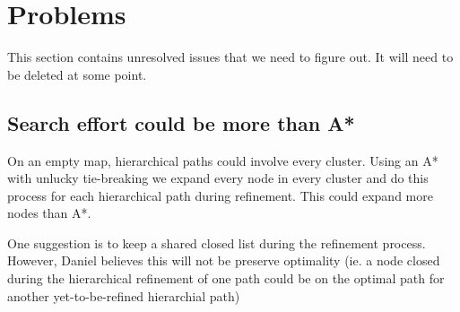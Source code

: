 \section{Problems}
This section contains unresolved issues that we need to figure out.
It will need to be deleted at some point.
\subsection{Search effort could be more than A*}
On an empty map, hierarchical paths could involve every cluster. 
Using an A* with unlucky tie-breaking we expand every node in every cluster and do this process for each hierarchical path during refinement. 
This could expand more nodes than A*.
\par
One suggestion is to keep a shared closed list during the refinement process. 
However, Daniel believes this will not be preserve optimality (ie. a node closed during the hierarchical refinement of one path could be on the optimal path for another yet-to-be-refined hierarchial path)
